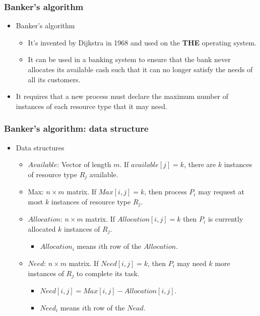 \documentclass[CJKutf8,xcolor=pdftex,dvipsnames,table]{beamer}
\begin{document}
\begin{CJK*}{UTF8}{song}
  \begin{frame}
  \frametitle{Banker's algorithm} \pause
  \begin{itemize}
  \item{Banker's algorithm} \pause
    \begin{itemize}
    \item{It's invented by Dijkstra in 1968 and used on the \textbf{THE} operating system.} \pause
    \item{It can be used in a banking system to ensure that the bank never allocates its available cash such that it can no longer satisfy the needs of all its customers.} \pause
    \end{itemize}
  \item{It requires that a new process must declare the maximum number of instances of each resource type that it may need.}
  \end{itemize}
  \end{frame}

  \begin{frame}
  \frametitle{Banker's algorithm: data structure} \pause
  \begin{itemize}
  \item{Data structures} \pause
    \begin{itemize}
    \item{$Available$:  Vector of length $m$. If $available[j] = k$, there are $k$ instances of resource type $R_j$ available.} \pause
    \item{Max: $n \times m$ matrix.  If $Max[i,j] = k$, then process $P_i$ may request at most $k$ instances of resource type $R_j$.} \pause
    \item{$Allocation$:  $n \times m$ matrix.  If $Allocation[i,j] = k$ then $P_i$ is currently allocated $k$ instances of $R_j$.} \pause
      \begin{itemize}
      \item{$Allocation_i$ means $i$th row of the $Allocation$.} \pause
      \end{itemize}
    \item{$Need$:  $n \times m$ matrix. If $Need[i,j] = k$, then $P_i$ may need $k$ more instances of $R_j$ to complete its task.} \pause
      \begin{itemize}
      \item{$Need[i,j] = Max[i,j] - Allocation [i,j]$.} \pause
      \item{$Need_i$ means $i$th row of the $Nead$.}
      \end{itemize}
    \end{itemize}
  \end{itemize}
  \end{frame}


\end{CJK*}
\end{document}

